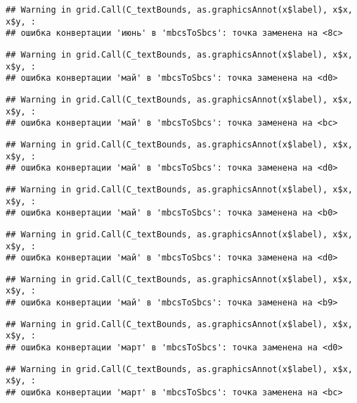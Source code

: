 \documentclass[
]{article}
\begin{document}
\begin{verbatim}
## Warning in grid.Call(C_textBounds, as.graphicsAnnot(x$label), x$x, x$y, :
## ошибка конвертации 'июнь' в 'mbcsToSbcs': точка заменена на <8c>
\end{verbatim}

\begin{verbatim}
## Warning in grid.Call(C_textBounds, as.graphicsAnnot(x$label), x$x, x$y, :
## ошибка конвертации 'май' в 'mbcsToSbcs': точка заменена на <d0>
\end{verbatim}

\begin{verbatim}
## Warning in grid.Call(C_textBounds, as.graphicsAnnot(x$label), x$x, x$y, :
## ошибка конвертации 'май' в 'mbcsToSbcs': точка заменена на <bc>
\end{verbatim}

\begin{verbatim}
## Warning in grid.Call(C_textBounds, as.graphicsAnnot(x$label), x$x, x$y, :
## ошибка конвертации 'май' в 'mbcsToSbcs': точка заменена на <d0>
\end{verbatim}

\begin{verbatim}
## Warning in grid.Call(C_textBounds, as.graphicsAnnot(x$label), x$x, x$y, :
## ошибка конвертации 'май' в 'mbcsToSbcs': точка заменена на <b0>
\end{verbatim}

\begin{verbatim}
## Warning in grid.Call(C_textBounds, as.graphicsAnnot(x$label), x$x, x$y, :
## ошибка конвертации 'май' в 'mbcsToSbcs': точка заменена на <d0>
\end{verbatim}

\begin{verbatim}
## Warning in grid.Call(C_textBounds, as.graphicsAnnot(x$label), x$x, x$y, :
## ошибка конвертации 'май' в 'mbcsToSbcs': точка заменена на <b9>
\end{verbatim}

\begin{verbatim}
## Warning in grid.Call(C_textBounds, as.graphicsAnnot(x$label), x$x, x$y, :
## ошибка конвертации 'март' в 'mbcsToSbcs': точка заменена на <d0>
\end{verbatim}

\begin{verbatim}
## Warning in grid.Call(C_textBounds, as.graphicsAnnot(x$label), x$x, x$y, :
## ошибка конвертации 'март' в 'mbcsToSbcs': точка заменена на <bc>
\end{verbatim}
\end{document}
